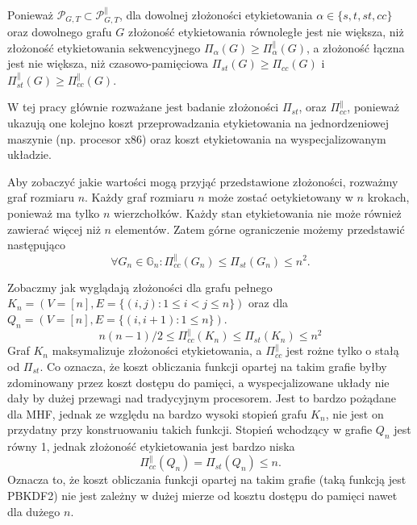 Ponieważ $ \mathcal{P}_{G,T} \subset  \mathcal{P}_{G,T}^{ \parallel } $, dla dowolnej złożoności etykietowania $ \alpha \in \{s, t, st, cc \}$ oraz dowolnego grafu $G$ złożoność etykietowania równoległe jest nie większa, niż złożoność etykietowania sekwencyjnego $ \Pi_{ \alpha }(G) \geq \Pi_{ \alpha}^{\parallel}(G)$, a złożoność łączna jest nie większa, niż czasowo-pamięciowa  $ \Pi_{ st }(G) \geq \Pi_{ cc }(G)$ i $ \Pi_{ st }^{ \parallel }(G) \geq \Pi_{ cc }^{ \parallel }(G)$.

W tej pracy głównie rozważane jest badanie złożoności $\Pi_{ st }$, oraz $\Pi_{ cc }^{ \parallel }$, ponieważ ukazują one kolejno koszt przeprowadzania etykietowania na jednordzeniowej maszynie (np. procesor x86) oraz koszt etykietowania na wyspecjalizowanym układzie.

Aby zobaczyć jakie wartości mogą przyjąć przedstawione złożoności, rozważmy graf rozmiaru $n$.
Każdy graf rozmiaru $n$ może zostać oetykietowany w $n$ krokach, ponieważ ma tylko $n$ wierzchołków. Każdy stan etykietowania nie może również zawierać więcej niż $n$ elementów. Zatem górne ograniczenie możemy przedstawić następująco
$$ \forall G_{n} \in \mathbb{G}_{n} : \Pi_{ cc }^{ \parallel }(G_{n}) \leq \Pi_{ st }(G_{n}) \leq n^{2} . $$

Zobaczmy jak wyglądają złożoności dla grafu pełnego $K_{n} = (V = [n], E= \{
(i,j): 1 \leq i < j \leq n \})$ oraz dla $Q_{n} = (V = [n], E = \{ (i, i+1) : 1 \leq n \} )$.
$$ n(n - 1) / 2 \leq \Pi_{ cc }^{ \parallel }(K_{n}) \leq \Pi_{ st }(K_{n}) \leq n^2$$
Graf $K_{n}$ maksymalizuje złożoności etykietowania, a  $\Pi_{ cc }^{ \parallel }$ jest rożne tylko o stałą od $\Pi_{ st }$. Co oznacza, że koszt obliczania funkcji opartej na takim grafie byłby zdominowany przez koszt dostępu do pamięci, a wyspecjalizowane układy nie dały by dużej przewagi nad tradycyjnym procesorem. Jest to bardzo pożądane dla MHF, jednak ze względu na bardzo wysoki stopień grafu $K_{n}$, nie jest on przydatny przy konstruowaniu takich funkcji.
Stopień wchodzący w grafie $Q_{n}$ jest równy 1, jednak złożoność etykietowania jest bardzo niska
$$ \Pi_{ cc }^{ \parallel }(Q_{n}) = \Pi_{ st }(Q_{n}) \leq n. $$ 
Oznacza to, że koszt obliczania funkcji opartej na takim grafie (taką funkcją jest PBKDF2) nie jest zależny w dużej mierze od kosztu dostępu do pamięci nawet dla dużego $n$. 



